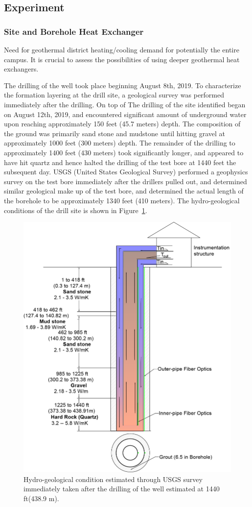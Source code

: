 \subsection{Experiment}
\subsubsection{Site and Borehole Heat Exchanger}
	Need for geothermal district heating/cooling demand for potentially the entire campus. It is crucial to assess the possibilities of using deeper geothermal heat exchangers.

	The drilling of the well took place beginning August 8th, 2019. To characterize the formation layering at the drill site, a geological survey was performed immediately after the drilling. On top of
	The drilling of the site identified began on August 12th, 2019, and encountered significant amount of underground water upon reaching approximately 150 feet (45.7 meters) depth. The composition of the ground was primarily sand stone and mudstone until hitting gravel at approximately 1000 feet (300 meters) depth. The remainder of the drilling to approximately 1400 feet (430 meters) took significantly longer, and appeared to have hit quartz and hence halted the drilling of the test bore at 1440 feet the subsequent day. USGS (United States Geological Survey) performed a geophysics survey on the test bore immediately after the drillers pulled out, and determined similar geological make up of the test bore, and determined the actual length of the borehole to be approximately 1340 feet (410 meters). The hydro-geological conditions of the drill site is shown in Figure~\ref{fg:hydro}.

	\begin{figure}[h!]
	\centering
	\includegraphics[height=0.5\textwidth]{data/geology_cbhe.png}
	\caption{Hydro-geological condition estimated through USGS survey immediately taken after the drilling of the well estimated at 1440 ft(438.9 m).}\label{fg:hydro}
	\end{figure}

